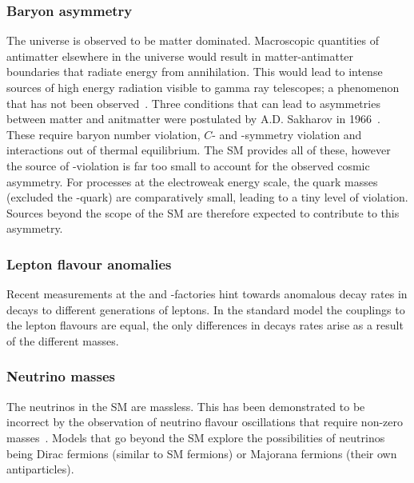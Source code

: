 \subsubsection{Baryon asymmetry} 

The universe is observed to be matter dominated. Macroscopic quantities of antimatter elsewhere in the universe would result in matter-antimatter boundaries that radiate energy from annihilation. This would lead to intense sources of high energy radiation visible to gamma ray telescopes; a phenomenon that has not been observed~\cite{vonBallmoos2014}. 
Three conditions that can lead to asymmetries between matter and anitmatter were postulated by A.D. Sakharov in 1966~\cite{Sakharov:1967dj}. These require baryon number violation, $C$- and \CP-symmetry violation and interactions out of thermal equilibrium. The SM provides all of these, however the source of \CP-violation is far too small to account for the observed cosmic asymmetry. For processes at the electroweak energy scale, the quark masses (excluded the \tquark-quark) are comparatively small, leading to a tiny level of \CP violation. Sources beyond the scope of the SM are therefore expected to contribute to this asymmetry. 

\subsubsection{Lepton flavour anomalies}
Recent measurements at the \lhc and \B-factories hint towards anomalous decay rates in decays to different generations of leptons. In the standard model the couplings to the lepton flavours are equal, the only differences in decays rates arise as a result of the different masses.


\subsubsection{Neutrino masses} 
The neutrinos in the SM are massless. This has been demonstrated to be incorrect by the observation of neutrino flavour oscillations that require non-zero masses~\cite{PhysRevLett.81.1158,PhysRevLett.87.071301}. Models that go beyond the SM explore the possibilities of neutrinos being Dirac fermions (similar to SM fermions) or Majorana fermions (their own antiparticles). 

